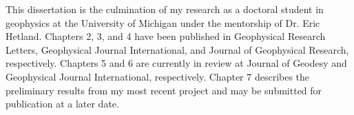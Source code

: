 This dissertation is the culmination of my research as a doctoral
student in geophysics at the University of Michigan under the
mentorship of Dr. Eric Hetland. Chapters 2, 3, and 4 have been
published in Geophysical Research Letters, Geophysical Journal
International, and Journal of Geophysical Research, respectively.
Chapters 5 and 6 are currently in review at Journal of Geodesy and
Geophysical Journal International, respectively. Chapter 7 describes
the preliminary results from my most recent project and may be
submitted for publication at a later date.
